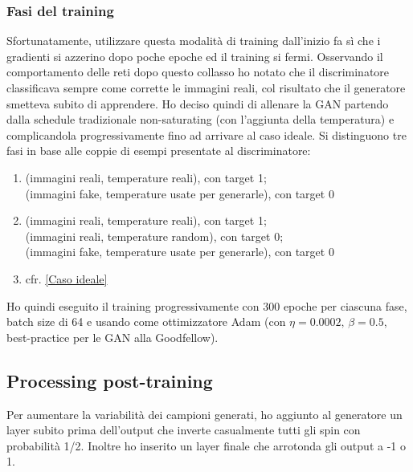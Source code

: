\documentclass[a4paper]{article}
\begin{document}
\subsubsection{Fasi del training}
Sfortunatamente, utilizzare questa modalità di training dall'inizio fa sì che i gradienti si azzerino dopo poche epoche ed il training si fermi. Osservando il comportamento delle reti dopo questo collasso ho notato che il discriminatore classificava sempre come corrette le immagini reali, col risultato che il generatore smetteva subito di apprendere. Ho deciso quindi di allenare la GAN partendo dalla schedule tradizionale non-saturating (con l'aggiunta della temperatura) e complicandola progressivamente fino ad arrivare al caso ideale.
Si distinguono tre fasi in base alle coppie di esempi presentate al discriminatore:
\begin{enumerate}[label=\Alph*:]
\item (immagini reali, temperature reali), con target 1;\\(immagini fake, temperature usate per generarle), con target 0
\item (immagini reali, temperature reali), con target 1;\\(immagini reali, temperature random), con target 0;\\(immagini fake, temperature usate per generarle), con target 0
\item cfr. \ref{Caso ideale}
\end{enumerate}
\newpage
Ho quindi eseguito il training progressivamente con 300 epoche per ciascuna fase, batch size di 64 e usando come ottimizzatore Adam \cite{adam} (con $\eta=0.0002,\,\beta=0.5$, best-practice per le GAN alla Goodfellow).
\subsection{Processing post-training}
Per aumentare la variabilità dei campioni generati, ho aggiunto al generatore un layer subito prima dell'output che inverte casualmente tutti gli spin con probabilità 1/2. Inoltre ho inserito un layer finale che arrotonda gli output a -1 o 1.
\end{document}
